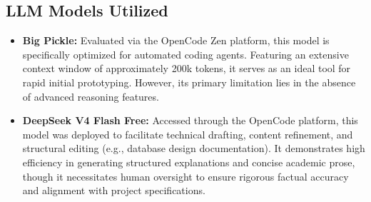 \subsection{LLM Models Utilized}
\begin{itemize}
    \item \textbf{Big Pickle:} Evaluated via the OpenCode Zen platform, this model is specifically optimized for automated coding agents. Featuring an extensive context window of approximately 200k tokens, it serves as an ideal tool for rapid initial prototyping. However, its primary limitation lies in the absence of advanced reasoning features.
    
    \item \textbf{DeepSeek V4 Flash Free:} Accessed through the OpenCode platform, this model was deployed to facilitate technical drafting, content refinement, and structural editing (e.g., database design documentation). It demonstrates high efficiency in generating structured explanations and concise academic prose, though it necessitates human oversight to ensure rigorous factual accuracy and alignment with project specifications.
\end{itemize}